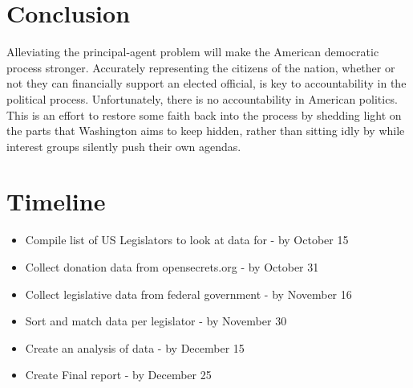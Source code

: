 \documentclass[journal]{IEEEtran}
\begin{document}
\section{Conclusion}

Alleviating the principal-agent problem will make the American democratic process stronger. Accurately representing the citizens of the nation, whether or not they can financially support an elected official, is key to accountability in the political process. Unfortunately, there is no accountability in American politics. This is an effort to restore some faith back into the process by shedding light on the parts that Washington aims to keep hidden, rather than sitting idly by while interest groups silently push their own agendas.

\section{Timeline}
\begin{itemize}
 \item Compile list of US Legislators to look at data for - by October 15
 \item Collect donation data from opensecrets.org - by October 31
 \item Collect legislative data from federal government - by November 16
 \item Sort and match data per legislator - by November 30
 \item Create an analysis of data - by December 15
 \item Create Final report - by December 25
\end{itemize}
\end{document}
